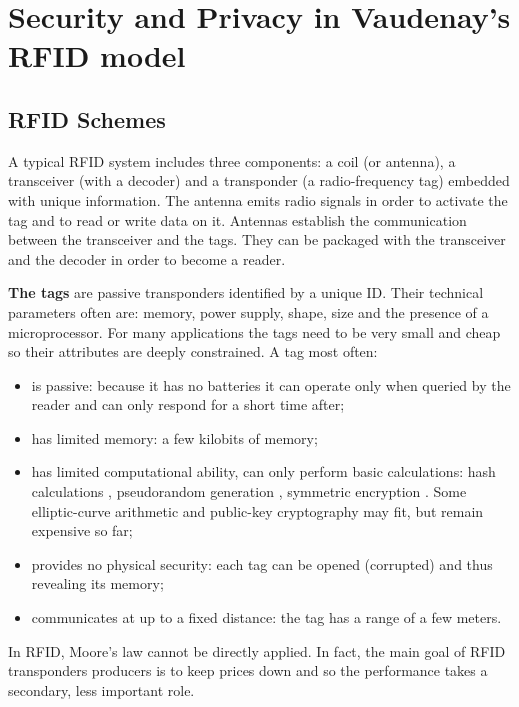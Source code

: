 \chapter{Security and Privacy in Vaudenay's RFID model}

\section{RFID Schemes}

        A typical RFID system includes three components: a coil (or antenna), a transceiver (with a decoder) and a
    transponder (a radio-frequency tag) embedded with unique information. The antenna emits radio signals in order to activate the tag and 
    to read or write data on it. Antennas establish the communication between the transceiver and the tags. They can be packaged with 
    the transceiver and the decoder in order to become a reader. 

        \textbf{The tags} are passive transponders identified by a unique ID. Their technical parameters often are: memory, power supply, shape, size and the presence of a 
    microprocessor. For many applications the tags need to be very small and cheap so their attributes are deeply constrained. A tag most often:
    \begin{itemize}
        \item is passive: because it has no batteries it can operate only when queried by the reader and can only respond for a short time after;
        \item has limited memory: a few kilobits of memory;
        \item has limited computational ability, can only perform basic calculations: hash calculations \cite{Feldhofer}, pseudorandom generation \cite{Robshaw}, 
        symmetric encryption \cite{Feldhofer2}. Some elliptic-curve arithmetic and public-key cryptography may fit, but remain expensive so far;
        \item provides no physical security: each tag can be opened (corrupted) and thus revealing its memory;
        \item communicates at up to a fixed distance: the tag has a range of a few meters.
    \end{itemize}
    
    In RFID, Moore's law cannot be directly applied. In fact, the main goal of RFID transponders producers is to keep prices down and so the performance takes
    a secondary, less important role.


